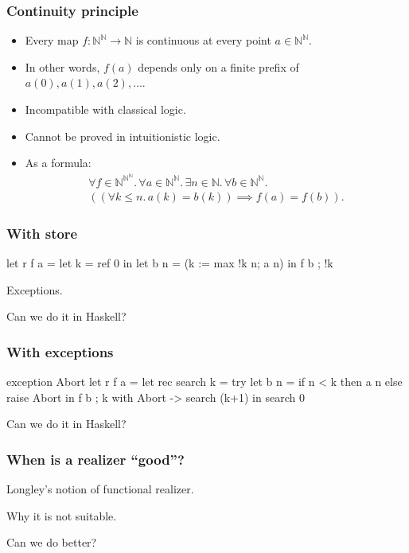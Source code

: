 \documentclass[t]{beamer}
\newcommand{\NN}{\mathbb{N}}
\begin{document}
\begin{frame}
  \frametitle{Continuity principle}

  \begin{itemize}
  \item 
    Every map $f : \NN^\NN \to \NN$ is continuous at every point $a \in
    \NN^\NN$.
  \item 
    In other words, $f(a)$ depends only on a finite prefix of
    $a(0), a(1), a(2), \ldots$.
  \item Incompatible with classical logic.
  \item Cannot be proved in intuitionistic logic.
  \item As a formula:
    \begin{multline*}
      \forall f \in \NN^{\NN^\NN} .\,
      \forall a \in  \NN^\NN.\,
      \exists n \in \NN .\,
      \forall b \in \NN^\NN .\,\\
      ((\forall k \leq n .\, a(k) = b(k)) \implies f(a) = f(b)).
    \end{multline*}
  \end{itemize}

\end{frame}

\begin{frame}[fragile]
  \frametitle{With store}

\begin{source}
let r f a =
  let k = ref 0 in
  let b n = (k := max !k n; a n) in
    f b ; !k
\end{source}


  Exceptions.

  Can we do it in Haskell?
\end{frame}

\begin{frame}[fragile]
  \frametitle{With exceptions}

\begin{source}
exception Abort
let r f a =
  let rec search k =
    try
      let b n = 
        if n < k then a n else raise Abort
      in
        f b ; k
    with Abort -> search (k+1)
  in
    search 0
\end{source}

  Can we do it in Haskell?
\end{frame}

\begin{frame}
  \frametitle{When is a realizer ``good''?}

  Longley's notion of functional realizer.

  Why it is not suitable.

  Can we do better?
\end{frame}
\end{document}
